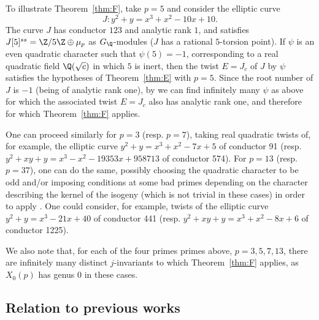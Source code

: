 To illustrate Theorem~\ref{thm:F}, take $p=5$ and consider the elliptic curve
\begin{displaymath}
J: y^2+y=x^3+x^2-10x+10.
\end{displaymath}
The curve $J$ has conductor $123$ and analytic rank $1$, and satisfies $J[5]^{ss}=\Z/5\Z\oplus\mu_p$ as $G_\Q$-modules ($J$ has a rational $5$-torsion point). If $\psi$ is an even quadratic character such that $\psi(5)=-1$, corresponding to a real quadratic field $\Q(\sqrt{c})$ in which $5$ is inert, then the twist $E=J_c$ of $J$ by $\psi$ satisfies the hypotheses of Theorem~\ref{thm:E} with $p=5$. Since the root number of $J$ is $-1$ (being of analytic rank one), by \cite[Thm.~B.2]{twist} we can find infinitely many $\psi$ as above for which the associated twist $E=J_c$ also has analytic rank one, and therefore for which Theorem~\ref{thm:F} applies.

One can proceed similarly for $p=3$ (resp. $p=7$), taking real quadratic twists of, for example, the elliptic curve $y^2+y=x^3+x^2-7x+5$ of conductor 91 (resp. $y^2+xy+y=x^{3}-x^{2}-19353x+958713$ of conductor 574). For $p=13$ (resp. $p=37$), one can do the same, possibly choosing the quadratic character to be odd and/or imposing conditions at some bad primes depending on the character describing the kernel of the isogeny (which is not trivial in these cases) in order to apply \cite[Thm.~B.2]{twist}. One could consider, for example, twists of the elliptic curve $y^2+y=x^3-21x+40$ of conductor 441 (resp. $y^2+xy+y=x^3+x^2-8x+6$ of conductor 1225).

We also note that, for each of the four primes primes above, $p=3,5,7,13$, there are infinitely many distinct $j$-invariants to which Theorem~\ref{thm:F} applies, as $X_0(p)$ has genus $0$ in these cases.


\subsection{Relation to previous works}

